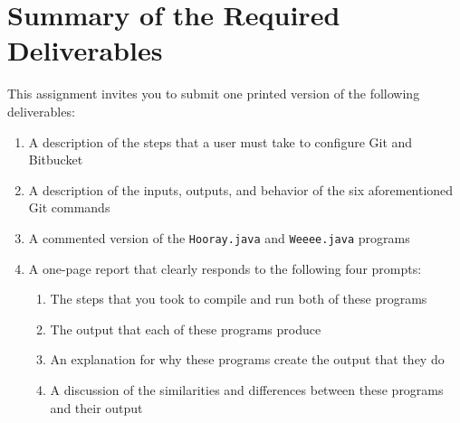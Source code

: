 \section*{}


  

\section*{Summary of the Required Deliverables}

  This assignment invites you to submit one printed version of the following deliverables:

  \vspace*{-.05in}
  \begin{enumerate}
	
    \item A description of the steps that a user must take to configure Git and Bitbucket

    \item A description of the inputs, outputs, and behavior of the six aforementioned Git commands

    \item A commented version of the {\tt Hooray.java} and {\tt Weeee.java} programs
	
    \item A one-page report that clearly responds to the following four prompts:
  
      \vspace*{-.05in}
      \begin{enumerate}

	\item The steps that you took to compile and run both of these programs

	\item The output that each of these programs produce

	\item An explanation for why these programs create the output that they do

	\item A discussion of the similarities and differences between these programs and their output

      \end{enumerate}

  \end{enumerate}

